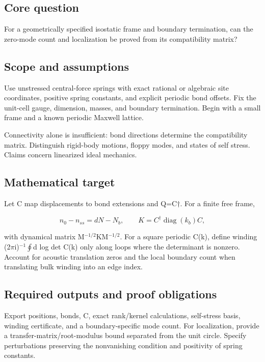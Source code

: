\documentclass[
  11pt,
]{article}
\begin{document}
\subsection{Core question}

For a geometrically specified isostatic frame and boundary termination,
can the zero-mode count and localization be proved from its
compatibility matrix?

\subsection{Scope and assumptions}

Use unstressed central-force springs with exact rational or algebraic
site coordinates, positive spring constants, and explicit periodic bond
offsets. Fix the unit-cell gauge, dimension, masses, and boundary
termination. Begin with a small frame and a known periodic Maxwell
lattice.

Connectivity alone is insufficient: bond directions determine the
compatibility matrix. Distinguish rigid-body motions, floppy modes, and
states of self stress. Claims concern linearized ideal mechanics.

\subsection{Mathematical target}

Let C map displacements to bond extensions and Q=C\ensuremath{\dagger}.
For a finite free frame,

\[n_0- n_{ss}=dN- N_b,\qquad K=C^{\dagger }\operatorname{diag}(k_b)C,\]

with dynamical matrix M\ensuremath{{}^{-1/2}}KM\ensuremath{{}^{-1/2}}.
For a square periodic C(k), define winding
(2\ensuremath{\pi}i)\ensuremath{{}^{-1}}\ensuremath{\oint}d log det C(k)
only along loops where the determinant is nonzero. Account for acoustic
translation zeros and the local boundary count when translating bulk
winding into an edge index.

\subsection{Required outputs and proof obligations}

Export positions, bonds, C, exact rank/kernel calculations, self-stress
basis, winding certificate, and a boundary-specific mode count. For
localization, provide a transfer-matrix/root-modulus bound separated
from the unit circle. Specify perturbations preserving the nonvanishing
condition and positivity of spring constants.
\end{document}
